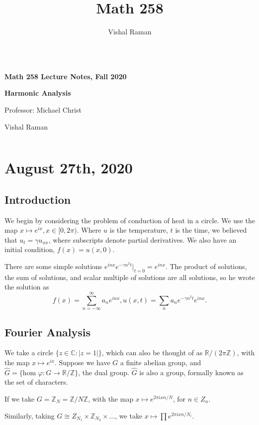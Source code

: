 \documentclass[11pt]{scrartcl}
\newcommand{\Z}{\mathbb{Z}}
\newcommand{\R}{\mathbb{R}}
\newcommand{\C}{\mathbb C}
\let \phi \varphi
\begin{document}
\title{Math 258}
\author{Vishal Raman}
\thispagestyle{empty}
$ $
\vfill
\begin{center}

\centerline{\huge \textbf{Math 258 Lecture Notes, Fall 2020}}
\centerline{\Large \textbf{Harmonic Analysis} } 
\centerline{Professor: Michael Christ}
\centerline{Vishal Raman}
\end{center}
\vfill
$ $
\newpage
\thispagestyle{empty}
\tableofcontents
\newpage
\section{August 27th, 2020}
\subsection{Introduction}
We begin by considering the problem of conduction of heat in a circle.  We use the map $x \mapsto e^{ix}, x \in [0, 2\pi)$.  Where $u$ is the temperature, $t$ is the time, we believed that $u_t = \gamma u_{xx}$, where subscripts denote partial derivatives.  We also have an initial condition, $f(x) = u(x, 0)$.

There are some simple solutions $e^{inx}e^{-\gamma n^2t}|_{t=0} = e^{inx}$.  The product of solutions, the sum of solutions, and scalar multiple of solutions are all solutions, so he wrote the solution as $$f(x) = \sum_{n = -\infty}^{\infty} a_n e^{inx}, u(x, t) = \sum_{n} a_n e^{-\gamma n^2t}e^{inx}.$$

\subsection{Fourier Analysis}
We take a circle $\{z \in \C : |z = 1|\}$, which can also be thought of as $\R/(2\pi\Z)$, with the map $x \mapsto e^{ix}$. 
 Suppose we have $G$ a finite abelian group, and $\hat{G} = \{\text{hom }\phi:G \rightarrow \R/\Z \}$, the dual group.  $\hat{G}$ is also a group, formally known as the set of characters.

\begin{example} If we take $G = \Z_N = \Z/N\Z$, with the map $x \mapsto e^{2\pi i xn/N}$, for $n \in Z_n$.

 Similarly, taking $G \cong Z_{N_1} \times \Z_{N_2} \times \dots$, we take $x \mapsto \prod e^{2\pi i xn/N_i}$.
\end{example}
\end{document}
